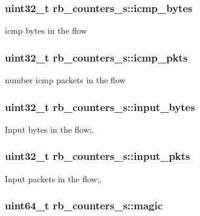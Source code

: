 \subsubsection[{icmp\+\_\+bytes}]{\setlength{\rightskip}{0pt plus 5cm}uint32\+\_\+t rb\+\_\+counters\+\_\+s\+::icmp\+\_\+bytes}\label{structrb__counters__s_aa06f1ab9ee525c6559ee80637013f92d}


icmp bytes in the flow 

\subsubsection[{icmp\+\_\+pkts}]{\setlength{\rightskip}{0pt plus 5cm}uint32\+\_\+t rb\+\_\+counters\+\_\+s\+::icmp\+\_\+pkts}\label{structrb__counters__s_a6d5c2ba252a0952f600eccfa2d8bde17}


number icmp packets in the flow 

\subsubsection[{input\+\_\+bytes}]{\setlength{\rightskip}{0pt plus 5cm}uint32\+\_\+t rb\+\_\+counters\+\_\+s\+::input\+\_\+bytes}\label{structrb__counters__s_a2a7aad9db4af2d8909fffd8affd850a0}


Input bytes in the flow;. 

\subsubsection[{input\+\_\+pkts}]{\setlength{\rightskip}{0pt plus 5cm}uint32\+\_\+t rb\+\_\+counters\+\_\+s\+::input\+\_\+pkts}\label{structrb__counters__s_a12f45ccf5c1f9f09849f7ffa0a6a0294}


Input packets in the flow;. 

\subsubsection[{magic}]{\setlength{\rightskip}{0pt plus 5cm}uint64\+\_\+t rb\+\_\+counters\+\_\+s\+::magic}\label{structrb__counters__s_a4637efba80a0b333e28d08e0ac5fcbc2}



